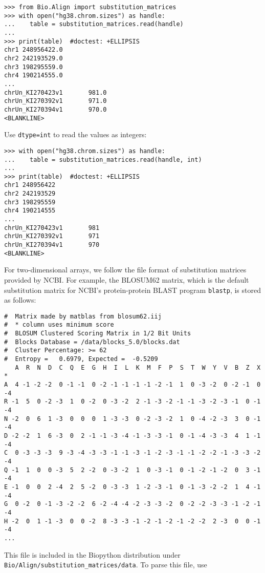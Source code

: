 \begin{verbatim}
>>> from Bio.Align import substitution_matrices
>>> with open("hg38.chrom.sizes") as handle:
...    table = substitution_matrices.read(handle)
...
>>> print(table)  #doctest: +ELLIPSIS
chr1 248956422.0
chr2 242193529.0
chr3 198295559.0
chr4 190214555.0
...
chrUn_KI270423v1       981.0
chrUn_KI270392v1       971.0
chrUn_KI270394v1       970.0
<BLANKLINE>
\end{verbatim}
Use \verb+dtype=int+ to read the values as integers:

\begin{verbatim}
>>> with open("hg38.chrom.sizes") as handle:
...    table = substitution_matrices.read(handle, int)
...
>>> print(table)  #doctest: +ELLIPSIS
chr1 248956422
chr2 242193529
chr3 198295559
chr4 190214555
...
chrUn_KI270423v1       981
chrUn_KI270392v1       971
chrUn_KI270394v1       970
<BLANKLINE>
\end{verbatim}

For two-dimensional arrays, we follow the file format of substitution matrices provided by NCBI. For example, the BLOSUM62 matrix, which is the default substitution matrix for NCBI's protein-protein BLAST \cite{altschul1990} program \verb+blastp+, is stored as follows:
\begin{verbatim}
#  Matrix made by matblas from blosum62.iij
#  * column uses minimum score
#  BLOSUM Clustered Scoring Matrix in 1/2 Bit Units
#  Blocks Database = /data/blocks_5.0/blocks.dat
#  Cluster Percentage: >= 62
#  Entropy =   0.6979, Expected =  -0.5209
   A  R  N  D  C  Q  E  G  H  I  L  K  M  F  P  S  T  W  Y  V  B  Z  X  *
A  4 -1 -2 -2  0 -1 -1  0 -2 -1 -1 -1 -1 -2 -1  1  0 -3 -2  0 -2 -1  0 -4 
R -1  5  0 -2 -3  1  0 -2  0 -3 -2  2 -1 -3 -2 -1 -1 -3 -2 -3 -1  0 -1 -4 
N -2  0  6  1 -3  0  0  0  1 -3 -3  0 -2 -3 -2  1  0 -4 -2 -3  3  0 -1 -4 
D -2 -2  1  6 -3  0  2 -1 -1 -3 -4 -1 -3 -3 -1  0 -1 -4 -3 -3  4  1 -1 -4 
C  0 -3 -3 -3  9 -3 -4 -3 -3 -1 -1 -3 -1 -2 -3 -1 -1 -2 -2 -1 -3 -3 -2 -4 
Q -1  1  0  0 -3  5  2 -2  0 -3 -2  1  0 -3 -1  0 -1 -2 -1 -2  0  3 -1 -4 
E -1  0  0  2 -4  2  5 -2  0 -3 -3  1 -2 -3 -1  0 -1 -3 -2 -2  1  4 -1 -4 
G  0 -2  0 -1 -3 -2 -2  6 -2 -4 -4 -2 -3 -3 -2  0 -2 -2 -3 -3 -1 -2 -1 -4 
H -2  0  1 -1 -3  0  0 -2  8 -3 -3 -1 -2 -1 -2 -1 -2 -2  2 -3  0  0 -1 -4 
...
\end{verbatim}
This file is included in the Biopython distribution under \verb+Bio/Align/substitution_matrices/data+. To parse this file, use

